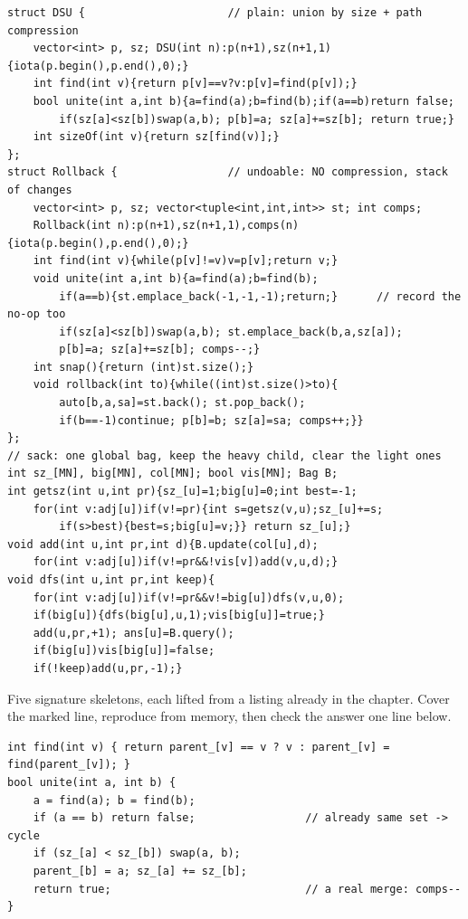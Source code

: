 \begin{lstlisting}[caption={Chapter 17 kit: DSU, rollback, and the sack, complete and production-shaped}, label={lst:c28-kit}]
struct DSU {                      // plain: union by size + path compression
    vector<int> p, sz; DSU(int n):p(n+1),sz(n+1,1){iota(p.begin(),p.end(),0);}
    int find(int v){return p[v]==v?v:p[v]=find(p[v]);}
    bool unite(int a,int b){a=find(a);b=find(b);if(a==b)return false;
        if(sz[a]<sz[b])swap(a,b); p[b]=a; sz[a]+=sz[b]; return true;}
    int sizeOf(int v){return sz[find(v)];}
};
struct Rollback {                 // undoable: NO compression, stack of changes
    vector<int> p, sz; vector<tuple<int,int,int>> st; int comps;
    Rollback(int n):p(n+1),sz(n+1,1),comps(n){iota(p.begin(),p.end(),0);}
    int find(int v){while(p[v]!=v)v=p[v];return v;}
    void unite(int a,int b){a=find(a);b=find(b);
        if(a==b){st.emplace_back(-1,-1,-1);return;}      // record the no-op too
        if(sz[a]<sz[b])swap(a,b); st.emplace_back(b,a,sz[a]);
        p[b]=a; sz[a]+=sz[b]; comps--;}
    int snap(){return (int)st.size();}
    void rollback(int to){while((int)st.size()>to){
        auto[b,a,sa]=st.back(); st.pop_back();
        if(b==-1)continue; p[b]=b; sz[a]=sa; comps++;}}
};
// sack: one global bag, keep the heavy child, clear the light ones
int sz_[MN], big[MN], col[MN]; bool vis[MN]; Bag B;
int getsz(int u,int pr){sz_[u]=1;big[u]=0;int best=-1;
    for(int v:adj[u])if(v!=pr){int s=getsz(v,u);sz_[u]+=s;
        if(s>best){best=s;big[u]=v;}} return sz_[u];}
void add(int u,int pr,int d){B.update(col[u],d);
    for(int v:adj[u])if(v!=pr&&!vis[v])add(v,u,d);}
void dfs(int u,int pr,int keep){
    for(int v:adj[u])if(v!=pr&&v!=big[u])dfs(v,u,0);
    if(big[u]){dfs(big[u],u,1);vis[big[u]]=true;}
    add(u,pr,+1); ans[u]=B.query();
    if(big[u])vis[big[u]]=false;
    if(!keep)add(u,pr,-1);}
\end{lstlisting}


Five signature skeletons, each lifted from a listing already in the chapter.
Cover the marked line, reproduce from memory, then check the answer one line
below.

\begin{lstlisting}[caption={Drill 1 -- find + union by size (from lst:c28-find / lst:c28-union)}]
int find(int v) { return parent_[v] == v ? v : parent_[v] = find(parent_[v]); }
bool unite(int a, int b) {
    a = find(a); b = find(b);
    if (a == b) return false;                 // already same set -> cycle
    if (sz_[a] < sz_[b]) swap(a, b);
    parent_[b] = a; sz_[a] += sz_[b];
    return true;                              // a real merge: comps--
}
\end{lstlisting}

